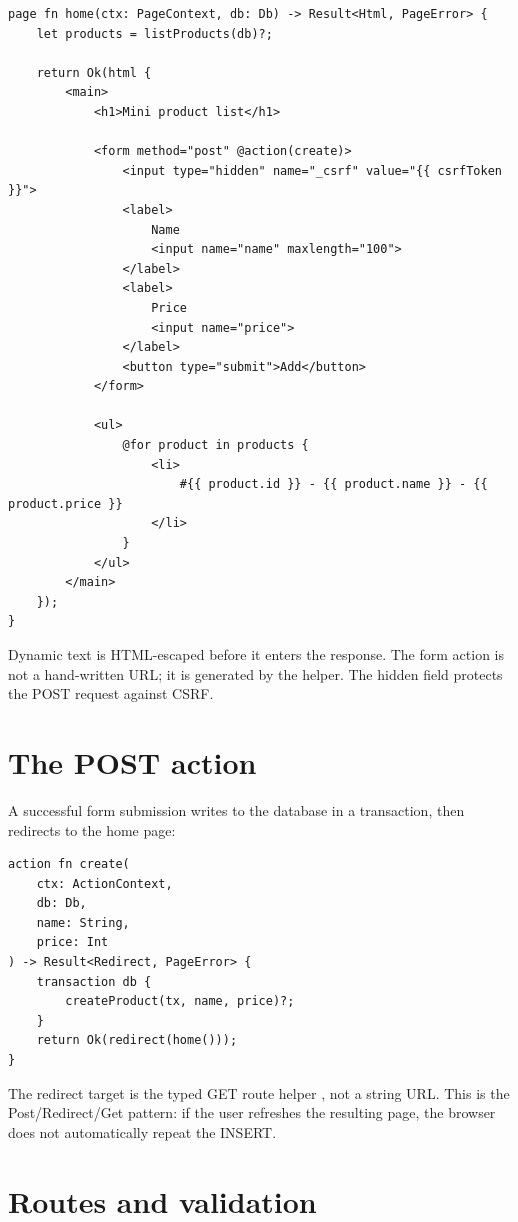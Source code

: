 \begin{lstlisting}[language=RWLang]
page fn home(ctx: PageContext, db: Db) -> Result<Html, PageError> {
    let products = listProducts(db)?;

    return Ok(html {
        <main>
            <h1>Mini product list</h1>

            <form method="post" @action(create)>
                <input type="hidden" name="_csrf" value="{{ csrfToken }}">
                <label>
                    Name
                    <input name="name" maxlength="100">
                </label>
                <label>
                    Price
                    <input name="price">
                </label>
                <button type="submit">Add</button>
            </form>

            <ul>
                @for product in products {
                    <li>
                        #{{ product.id }} - {{ product.name }} - {{ product.price }}
                    </li>
                }
            </ul>
        </main>
    });
}
\end{lstlisting}

Dynamic text is HTML-escaped before it enters the response. The form action is not a hand-written URL; it is generated by the  helper. The hidden  field protects the POST request against CSRF.

\section{The POST action}

A successful form submission writes to the database in a transaction, then redirects to the home page:

\begin{lstlisting}[language=RWLang]
action fn create(
    ctx: ActionContext,
    db: Db,
    name: String,
    price: Int
) -> Result<Redirect, PageError> {
    transaction db {
        createProduct(tx, name, price)?;
    }
    return Ok(redirect(home()));
}
\end{lstlisting}

The redirect target is the typed GET route helper , not a string URL. This is the Post/Redirect/Get pattern: if the user refreshes the resulting page, the browser does not automatically repeat the INSERT.

\section{Routes and validation}

